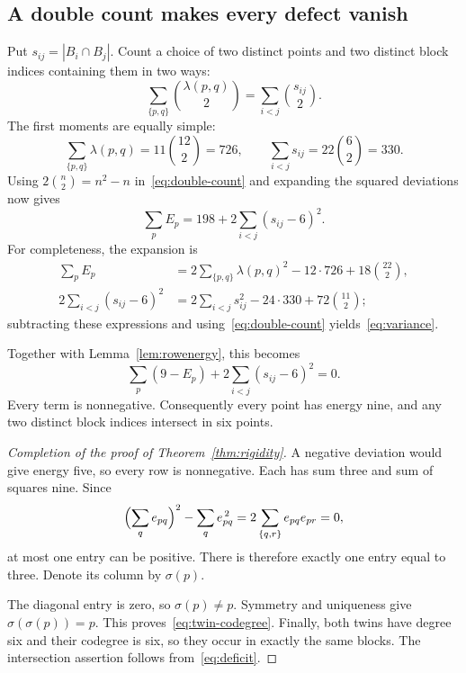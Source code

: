 \documentclass[11pt,letterpaper]{article}
\theoremstyle{definition}\newtheorem{definition}[theorem]{Definition}
\theoremstyle{remark}\newtheorem{remark}[theorem]{Remark}
\newcommand{\lam}{\lambda}
\begin{document}
\subsection{A double count makes every defect vanish}
Put $s_{ij}=|B_i\cap B_j|$. Count a choice of two distinct points and two distinct block indices containing them in two ways:
\begin{equation}\label{eq:double-count}
 \sum_{\{p,q\}}\binom{\lam(p,q)}2
 =\sum_{i<j}\binom{s_{ij}}2.
\end{equation}
The first moments are equally simple:
\[
 \sum_{\{p,q\}}\lam(p,q)=11\binom{12}{2}=726,
 \qquad
 \sum_{i<j}s_{ij}=22\binom62=330.
\]
Using $2\binom n2=n^2-n$ in~\eqref{eq:double-count} and expanding the squared deviations now gives
\begin{equation}\label{eq:variance}
 \sum_p E_p=198+2\sum_{i<j}(s_{ij}-6)^2.
\end{equation}
For completeness, the expansion is
\[
\begin{aligned}
\sum_pE_p
&=2\sum_{\{p,q\}}\lam(p,q)^2-12\cdot726+18\binom{22}{2},\\
2\sum_{i<j}(s_{ij}-6)^2
&=2\sum_{i<j}s_{ij}^2-24\cdot330+72\binom{11}{2};
\end{aligned}
\]
subtracting these expressions and using~\eqref{eq:double-count} yields~\eqref{eq:variance}.

Together with Lemma~\ref{lem:rowenergy}, this becomes
\begin{equation}\label{eq:deficit}
 \boxed{\ \sum_p(9-E_p)+2\sum_{i<j}(s_{ij}-6)^2=0.\ }
\end{equation}
Every term is nonnegative. Consequently every point has energy nine, and any two distinct block indices intersect in six points.

\begin{proof}[Completion of the proof of Theorem~\ref{thm:rigidity}]
A negative deviation would give energy five, so every row is nonnegative. Each has sum three and sum of squares nine. Since
\[
 \Bigl(\sum_q e_{pq}\Bigr)^2-\sum_q e_{pq}^{\,2}
 =2\sum_{\{q,r\}}e_{pq}e_{pr}=0,
\]
at most one entry can be positive. There is therefore exactly one entry equal to three. Denote its column by $\sigma(p)$.

The diagonal entry is zero, so $\sigma(p)\ne p$. Symmetry and uniqueness give $\sigma(\sigma(p))=p$. This proves~\eqref{eq:twin-codegree}. Finally, both twins have degree six and their codegree is six, so they occur in exactly the same blocks. The intersection assertion follows from~\eqref{eq:deficit}.
\end{proof}
\end{document}
